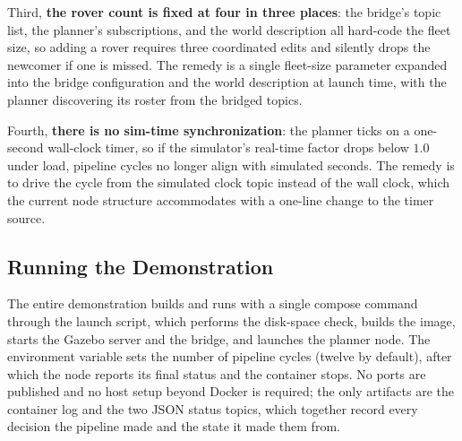 Third, \textbf{the rover count is fixed at four in three places}: the
bridge's topic list, the planner's subscriptions, and the world
description all hard-code the fleet size, so adding a rover requires
three coordinated edits and silently drops the newcomer if one is
missed. The remedy is a single fleet-size parameter expanded into the
bridge configuration and the world description at launch time, with the
planner discovering its roster from the bridged topics.

Fourth, \textbf{there is no sim-time synchronization}: the planner ticks
on a one-second wall-clock timer, so if the simulator's real-time factor
drops below $1.0$ under load, pipeline cycles no longer align with
simulated seconds. The remedy is to drive the cycle from the simulated
clock topic instead of the wall clock, which the current node structure
accommodates with a one-line change to the timer source.

\subsection{Running the Demonstration}
\label{sec:gazebo:run}

The entire demonstration builds and runs with a single compose command
through the launch script, which performs the disk-space check, builds
the image, starts the Gazebo server and the bridge, and launches the
planner node. The  environment variable sets the number of
pipeline cycles (twelve by default), after which the node reports its
final status and the container stops. No ports are published and no host
setup beyond Docker is required; the only artifacts are the container
log and the two JSON status topics, which together record every decision
the pipeline made and the state it made them from.
